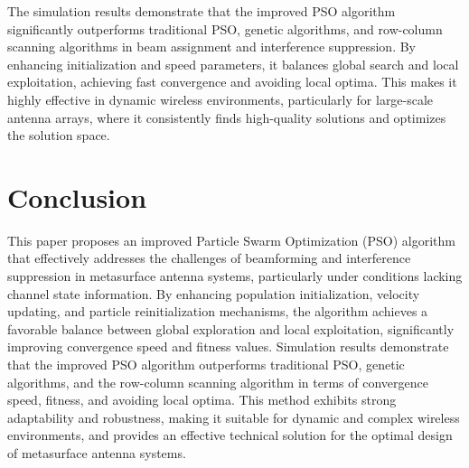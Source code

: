 \documentclass[lettersize,journal]{IEEEtran}
\begin{document}
The simulation results demonstrate that the improved PSO algorithm significantly outperforms traditional PSO, genetic algorithms, and row-column scanning algorithms in beam assignment and interference suppression. By enhancing initialization and speed parameters, it balances global search and local exploitation, achieving fast convergence and avoiding local optima. This makes it highly effective in dynamic wireless environments, particularly for large-scale antenna arrays, where it consistently finds high-quality solutions and optimizes the solution space.

\section{Conclusion}
This paper proposes an improved Particle Swarm Optimization (PSO) algorithm that effectively addresses the challenges of beamforming and interference suppression in metasurface antenna systems, particularly under conditions lacking channel state information. By enhancing population initialization, velocity updating, and particle reinitialization mechanisms, the algorithm achieves a favorable balance between global exploration and local exploitation, significantly improving convergence speed and fitness values. Simulation results demonstrate that the improved PSO algorithm outperforms traditional PSO, genetic algorithms, and the row-column scanning algorithm in terms of convergence speed, fitness, and avoiding local optima. This method exhibits strong adaptability and robustness, making it suitable for dynamic and complex wireless environments, and provides an effective technical solution for the optimal design of metasurface antenna systems.






\vfill
\end{document}
